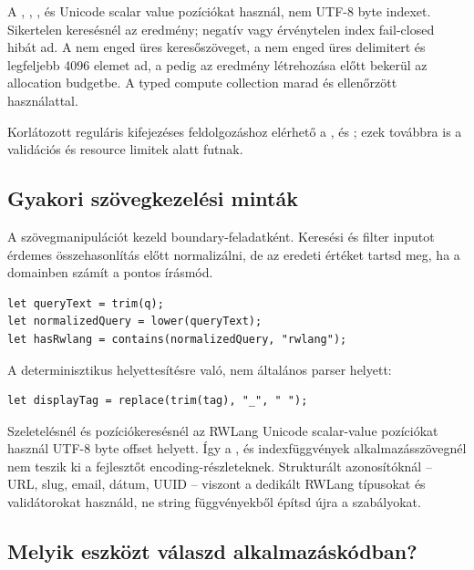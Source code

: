 A , , ,  és  Unicode scalar value pozíciókat használ, nem UTF-8 byte indexet. Sikertelen keresésnél  az eredmény; negatív vagy érvénytelen index fail-closed hibát ad. A  nem enged üres keresőszöveget, a  nem enged üres delimitert és legfeljebb 4096 elemet ad, a  pedig az eredmény létrehozása előtt bekerül az allocation budgetbe. A  typed compute collection marad  és ellenőrzött  használattal.

Korlátozott reguláris kifejezéses feldolgozáshoz elérhető a ,  és ; ezek továbbra is a validációs és resource limitek alatt futnak.

\subsection*{Gyakori szövegkezelési minták}

A szövegmanipulációt kezeld boundary-feladatként. Keresési és filter inputot érdemes összehasonlítás előtt normalizálni, de az eredeti értéket tartsd meg, ha a domainben számít a pontos írásmód.

\begin{lstlisting}[language=RWLang]
let queryText = trim(q);
let normalizedQuery = lower(queryText);
let hasRwlang = contains(normalizedQuery, "rwlang");
\end{lstlisting}

A  determinisztikus helyettesítésre való, nem általános parser helyett:

\begin{lstlisting}[language=RWLang]
let displayTag = replace(trim(tag), "_", " ");
\end{lstlisting}

Szeletelésnél és pozíciókeresésnél az RWLang Unicode scalar-value pozíciókat használ UTF-8 byte offset helyett. Így a ,  és indexfüggvények alkalmazásszövegnél nem teszik ki a fejlesztőt encoding-részleteknek. Strukturált azonosítóknál -- URL, slug, email, dátum, UUID -- viszont a dedikált RWLang típusokat és validátorokat használd, ne string függvényekből építsd újra a szabályokat.

\subsection*{Melyik eszközt válaszd alkalmazáskódban?}


